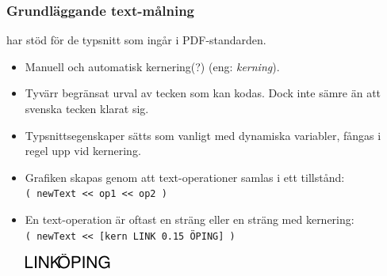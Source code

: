 \documentclass[noamsthm,handout]{beamer}
\newcommand{\inEnglish}[1]{(eng: \emph{#1})}
\begin{document}
\begin{frame}\frametitle{Grundläggande text-målning}
  \Shapes har stöd för de typsnitt som ingår i PDF-standarden.
  \begin{itemize}
  \item Manuell och automatisk kernering(?) \inEnglish{kerning}.
  \item Tyvärr begränsat urval av tecken som kan kodas.  Dock inte sämre än att svenska tecken klarat sig.
  \item Typsnittsegenskaper sätts som vanligt med dynamiska variabler, fångas i regel upp vid kernering.
  \item Grafiken skapas genom att text-operationer samlas i ett tillstånd:\\
    \texttt{( {\color{red}newText} <{}< op1 <{}< op2 )}
  \item En text-operation är oftast en sträng eller en sträng med kernering:\\
    \texttt{( {\color{red}newText} <{}< [kern \textasciigrave{}LINK\textasciiacute{} 0.15 \textasciigrave{}ÖPING\textasciiacute{}] )}\\
    \begin{center}
      \includegraphics{figures/linkoping}
    \end{center}
  \end{itemize}
\end{frame}
\end{document}
